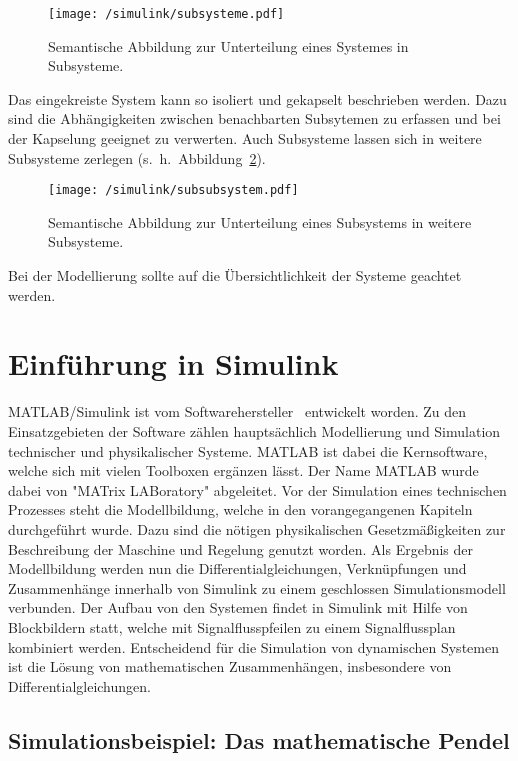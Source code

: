 \begin{figure}[h!]
	\centering
	\texttt{[image: /simulink/subsysteme.pdf]}
	\label{fig:subsysteme}
	\caption{Semantische Abbildung zur Unterteilung eines Systemes in Subsysteme.}
\end{figure}

Das eingekreiste System kann so isoliert und gekapselt beschrieben werden.
Dazu sind die Abhängigkeiten zwischen benachbarten Subsytemen zu erfassen und bei der Kapselung geeignet zu verwerten.
Auch Subsysteme lassen sich in weitere Subsysteme zerlegen (s.~h.~Abbildung~\ref{fig:subsubsysteme}).

\begin{figure}[h!]
	\centering
	\texttt{[image: /simulink/subsubsystem.pdf]}
	\label{fig:subsubsysteme}
	\caption{Semantische Abbildung zur Unterteilung eines Subsystems in weitere Subsysteme.}
\end{figure}

Bei der Modellierung sollte auf die Übersichtlichkeit der Systeme geachtet werden.

\section{Einführung in Simulink}\label{sec:simulink}

MATLAB/Simulink ist vom Softwarehersteller \grqq~entwickelt worden.
Zu den Einsatzgebieten der Software zählen hauptsächlich Modellierung und Simulation technischer und physikalischer Systeme. 
MATLAB ist dabei die Kernsoftware, welche sich mit vielen Toolboxen ergänzen lässt. 
Der Name MATLAB wurde dabei von "MATrix LABoratory" abgeleitet.
Vor der Simulation eines technischen Prozesses steht die Modellbildung, welche in den vorangegangenen Kapiteln durchgeführt wurde.
Dazu sind die nötigen physikalischen Gesetzmäßigkeiten zur Beschreibung der Maschine und Regelung genutzt worden.
Als Ergebnis der Modellbildung werden nun die Differentialgleichungen, Verknüpfungen und Zusammenhänge innerhalb von Simulink zu einem geschlossen Simulationsmodell verbunden. 
Der Aufbau von den Systemen findet in Simulink mit Hilfe von Blockbildern statt, welche mit Signalflusspfeilen zu einem Signalflussplan kombiniert werden. 
Entscheidend für die Simulation von dynamischen Systemen ist die Lösung von mathematischen Zusammenhängen, insbesondere von Differentialgleichungen. 

\subsection{Simulationsbeispiel: Das mathematische Pendel}

